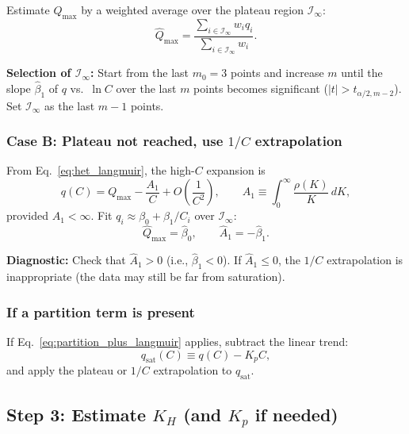 \documentclass[12pt]{article}
\begin{document}
Estimate $Q_{\max}$ by a weighted average over the plateau region
$\mathcal{I}_\infty$:
\begin{equation}
  \widehat{Q}_{\max} =
  \frac{\sum_{i\in\mathcal{I}_\infty} w_i q_i}
       {\sum_{i\in\mathcal{I}_\infty} w_i}.
  \label{eq:Qmax_plateau}
\end{equation}

\textbf{Selection of $\mathcal{I}_\infty$:}
Start from the last $m_0=3$ points and increase $m$ until the slope
$\widehat{\beta}_1$ of $q$ vs.\ $\ln C$ over the last $m$ points
becomes significant ($|t|>t_{\alpha/2,m-2}$).  Set
$\mathcal{I}_\infty$ as the last $m-1$ points.

\subsubsection{Case B: Plateau not reached, use $1/C$ extrapolation}

From Eq.~\eqref{eq:het_langmuir}, the high-$C$ expansion is
\begin{equation}
  q(C) = Q_{\max} - \frac{A_1}{C} + O\!\left(\frac{1}{C^2}\right),
  \qquad
  A_1 \equiv \int_0^\infty \frac{\rho(K)}{K}\,dK,
  \label{eq:highC_expansion}
\end{equation}
provided $A_1<\infty$.  Fit $q_i \approx \beta_0 + \beta_1/C_i$ over
$\mathcal{I}_\infty$:
\begin{equation}
  \widehat{Q}_{\max} = \widehat{\beta}_0,
  \qquad \widehat{A}_1 = -\widehat{\beta}_1.
\end{equation}

\textbf{Diagnostic:} Check that $\widehat{A}_1>0$ (i.e.,
$\widehat{\beta}_1<0$).  If $\widehat{A}_1\le 0$, the $1/C$
extrapolation is inappropriate (the data may still be far from
saturation).

\subsubsection{If a partition term is present}

If Eq.~\eqref{eq:partition_plus_langmuir} applies, subtract the linear
trend:
\[
  q_{\mathrm{sat}}(C) \equiv q(C) - K_p C,
\]
and apply the plateau or $1/C$ extrapolation to $q_{\mathrm{sat}}$.

\subsection{Step 3: Estimate $K_H$ (and $K_p$ if needed)}
\end{document}
